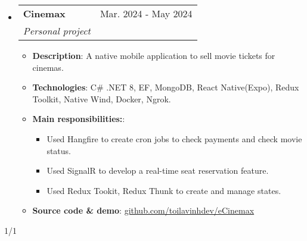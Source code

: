 \documentclass[letterpaper,11pt]{article}
\makeatletter
\newcommand{\resumeItem}[1]{
  \item\small{
    {#1 \vspace{-2pt}}
  }
}
\newcommand{\resumeSubheading}[4]{
  \vspace{-2pt}
  \item
    \begin{tabular*}{0.97\textwidth}[t]{l@{\extracolsep{\fill}}r}
      \textbf{#1} & #2 \\
      \textit{\small#3} & \textit{\small #4} \\
    \end{tabular*}
    \vspace{-7pt}
}
\newcommand{\resumeSubHeadingListStart} {
    \begin{itemize}[leftmargin=0.15in, label={}]
}
\newcommand{\resumeSubHeadingListEnd} {
    \end{itemize}
}
\newcommand{\resumeItemListStart} {
    \begin{itemize}
}
\newcommand{\resumeItemListEnd} {
    \end{itemize} 
    \vspace{-5pt}
}
\makeatother
\begin{document}
        \resumeSubHeadingListStart
            \resumeSubheading {Cinemax} {Mar. 2024 - May 2024} {Personal project} {}
            \resumeItemListStart
                \resumeItem{\textbf{Description}: A native mobile application to sell movie tickets for cinemas.}
                \resumeItem{\textbf{Technologies}: C\# .NET 8, EF, MongoDB, React Native(Expo), Redux Toolkit, Native Wind, Docker, Ngrok.}
                \resumeItem{\textbf{Main responsibilities:}:}
                \resumeItemListStart
                    \resumeItem{Used Hangfire to create cron jobs to check payments and check movie status.}
                    \resumeItem{Used SignalR to develop a real-time seat reservation feature.}
                    \resumeItem{Used Redux Tookit, Redux Thunk to create and manage states.}
                \resumeItemListEnd
                \vspace{0.15cm}
                \resumeItem{
                    \textbf{Source code \& demo}: \href{https://github.com/toilavinhdev/eCinemax}{\underline{github.com/toilavinhdev/eCinemax}}
                }
            \resumeItemListEnd
        \resumeSubHeadingListEnd

    \begin{center}
        \vspace{0.4cm}
        1/1
    \end{center} 
\end{document}
